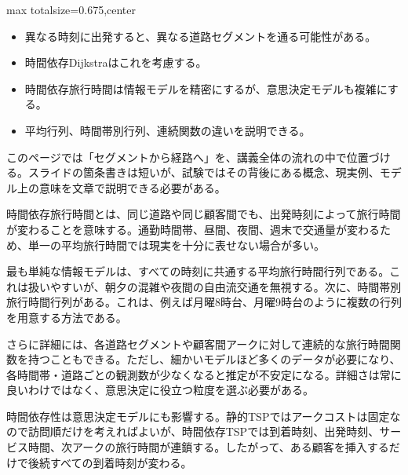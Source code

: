 \clearpage
{}
\begin{adjustbox}{max totalsize={\textwidth}{0.675\textheight},center}
\begin{minipage}{\textwidth}\scriptsize
\begin{minipage}[t]{0.485\textwidth}
\begin{itemize}
\item 異なる時刻に出発すると、異なる道路セグメントを通る可能性がある。
\item 時間依存Dijkstraはこれを考慮する。
\end{itemize}
\begin{itemize}
\item 時間依存旅行時間は情報モデルを精密にするが、意思決定モデルも複雑にする。
\item 平均行列、時間帯別行列、連続関数の違いを説明できる。
\end{itemize}
\end{minipage}\hfill
\begin{minipage}[t]{0.485\textwidth}
このページでは「セグメントから経路へ」を、講義全体の流れの中で位置づける。スライドの箇条書きは短いが、試験ではその背後にある概念、現実例、モデル上の意味を文章で説明できる必要がある。\par
時間依存旅行時間とは、同じ道路や同じ顧客間でも、出発時刻によって旅行時間が変わることを意味する。通勤時間帯、昼間、夜間、週末で交通量が変わるため、単一の平均旅行時間では現実を十分に表せない場合が多い。\par
最も単純な情報モデルは、すべての時刻に共通する平均旅行時間行列である。これは扱いやすいが、朝夕の混雑や夜間の自由流交通を無視する。次に、時間帯別旅行時間行列がある。これは、例えば月曜8時台、月曜9時台のように複数の行列を用意する方法である。\par
さらに詳細には、各道路セグメントや顧客間アークに対して連続的な旅行時間関数を持つこともできる。ただし、細かいモデルほど多くのデータが必要になり、各時間帯・道路ごとの観測数が少なくなると推定が不安定になる。詳細さは常に良いわけではなく、意思決定に役立つ粒度を選ぶ必要がある。\par
時間依存性は意思決定モデルにも影響する。静的TSPではアークコストは固定なので訪問順だけを考えればよいが、時間依存TSPでは到着時刻、出発時刻、サービス時間、次アークの旅行時間が連鎖する。したがって、ある顧客を挿入するだけで後続すべての到着時刻が変わる。\par

\end{minipage}
\end{minipage}
\end{adjustbox}
